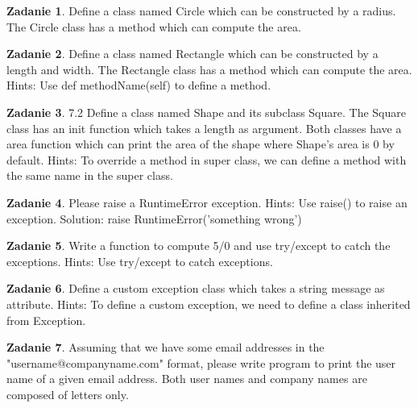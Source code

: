 \documentclass[11pt]{article}
\theoremstyle{definition}
\newtheorem{zadanie}{Zadanie}
\begin{document}
\begin{zadanie}
Define a class named Circle which can be constructed by a radius. The Circle class has a method which can compute the area.

\end{zadanie}

\begin{zadanie}
Define a class named Rectangle which can be constructed by a length and width. The Rectangle class has a method which can compute the area.
Hints:
Use def methodName(self) to define a method.

\end{zadanie}

\begin{zadanie}
7.2
Define a class named Shape and its subclass Square. The Square class has an init function which takes a length as argument. Both classes have a area function which can print the area of the shape where Shape's area is 0 by default.
Hints:
To override a method in super class, we can define a method with the same name in the super class.

\end{zadanie}

\begin{zadanie}
Please raise a RuntimeError exception.
Hints:
Use raise() to raise an exception.
Solution:
raise RuntimeError('something wrong')

\end{zadanie}

\begin{zadanie}
Write a function to compute 5/0 and use try/except to catch the exceptions.
Hints:
Use try/except to catch exceptions.

\end{zadanie}

\begin{zadanie}
Define a custom exception class which takes a string message as attribute.
Hints:
To define a custom exception, we need to define a class inherited from Exception.

\end{zadanie}

\begin{zadanie}
Assuming that we have some email addresses in the "username@companyname.com" format, please write program to print the user name of a given email address. Both user names and company names are composed of letters only.

\end{zadanie}
\end{document}
